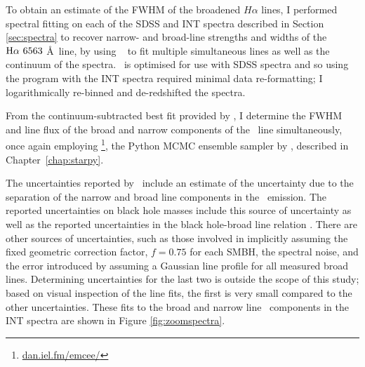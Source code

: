 To obtain an estimate of the FWHM of the broadened $H\alpha$ lines, I performed spectral fitting on each of the SDSS and INT spectra described in Section \ref{sec:spectra} to recover narrow- and broad-line strengths and widths of the $\mha\ 6563$ \AA\ line, by using \gandalf\ \citep{sarzi06} {\notebsm to fit multiple simultaneous lines as well as the continuum of the spectra}. \gandalf\ is optimised for use with SDSS spectra and so using the program with the INT spectra required minimal data re-formatting; I logarithmically re-binned and de-redshifted the spectra. {\notebsm From the continuum-subtracted best fit provided by \gandalf, I determine the FWHM and line flux of the broad and narrow components of the \ha\ line simultaneously, once again employing \emcee\footnote{\url{dan.iel.fm/emcee/}}, the Python MCMC ensemble sampler by \cite{emcee13}, described in Chapter~\ref{chap:starpy}. 

The uncertainties reported by \emcee\ include an estimate of the uncertainty due to the separation of the narrow and broad line components in the \ha\ emission. The reported uncertainties on black hole masses include this source of uncertainty as well as the reported uncertainties in the black hole-broad line relation \citep{gh07a}. There are other sources of uncertainties, such as those involved in implicitly assuming the fixed geometric correction factor, $f=0.75$ \citep{netzer90} for each SMBH, the spectral noise, and the error introduced by assuming a Gaussian line profile for all measured broad lines. Determining uncertainties for the last two is outside the scope of this study; based on visual inspection of the line fits, the first is very small compared to the other uncertainties. These fits to the broad and narrow line \ha \ components in the INT spectra are shown in Figure \ref{fig:zoomspectra}.

}

